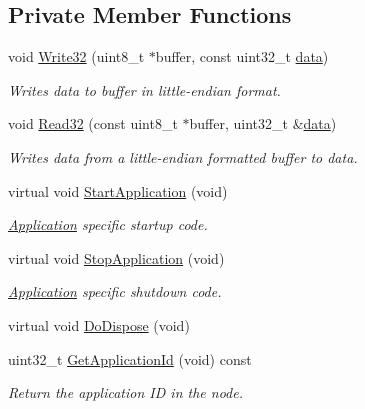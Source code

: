 \subsection*{Private Member Functions}
\begin{DoxyCompactItemize}
\item 
void \hyperlink{classns3_1_1V4Ping_a788f340b5a054f7fb2c7fc3206ee6d7f}{Write32} (uint8\+\_\+t $\ast$buffer, const uint32\+\_\+t \hyperlink{topology-example-sim_8cc_a26c65296e316af77b787dc77469bb2a4}{data})
\begin{DoxyCompactList}\small\item\em Writes data to buffer in little-\/endian format. \end{DoxyCompactList}\item 
void \hyperlink{classns3_1_1V4Ping_a00088be83cf04e08dd3c3a69ed4526d2}{Read32} (const uint8\+\_\+t $\ast$buffer, uint32\+\_\+t \&\hyperlink{topology-example-sim_8cc_a26c65296e316af77b787dc77469bb2a4}{data})
\begin{DoxyCompactList}\small\item\em Writes data from a little-\/endian formatted buffer to data. \end{DoxyCompactList}\item 
virtual void \hyperlink{classns3_1_1V4Ping_ac5176e135c81f0764bcd560c7fc71390}{Start\+Application} (void)
\begin{DoxyCompactList}\small\item\em \hyperlink{classns3_1_1Application}{Application} specific startup code. \end{DoxyCompactList}\item 
virtual void \hyperlink{classns3_1_1V4Ping_afbf27c64128d147b0d51dfa09ce7b1c8}{Stop\+Application} (void)
\begin{DoxyCompactList}\small\item\em \hyperlink{classns3_1_1Application}{Application} specific shutdown code. \end{DoxyCompactList}\item 
virtual void \hyperlink{classns3_1_1V4Ping_a78c38c5ceb8df123483c27421e2257ad}{Do\+Dispose} (void)
\item 
uint32\+\_\+t \hyperlink{classns3_1_1V4Ping_a294b811c91221c31618d4cdcb389a96b}{Get\+Application\+Id} (void) const 
\begin{DoxyCompactList}\small\item\em Return the application ID in the node. \end{DoxyCompactList}\item 

\end{DoxyCompactItemize}

